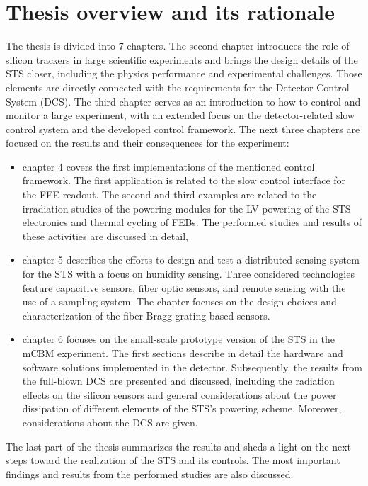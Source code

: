 \section{Thesis overview and its rationale}
The thesis is divided into 7 chapters. The second chapter introduces the role of silicon trackers in large scientific experiments and brings the design details of the \gls{STS} closer, including the physics performance and experimental challenges. Those elements are directly connected with the requirements for the Detector Control System (\gls{DCS}). The third chapter serves as an introduction to how to control and monitor a large experiment, with an extended focus on the detector-related slow control system and the developed control framework. The next three chapters are focused on the results and their consequences for the experiment:
\begin{itemize}
    \item chapter 4 covers the first implementations of the mentioned control framework. The first application is related to the slow control interface for the \gls{FEE} readout. The second and third examples are related to the irradiation studies of the powering modules for the \gls{LV} powering of the \gls{STS} electronics and thermal cycling of \glspl{FEB}. The performed studies and results of these activities are discussed in detail,
    \item chapter 5 describes the efforts to design and test a distributed sensing system for the \gls{STS} with a focus on humidity sensing. Three considered technologies feature capacitive sensors, fiber optic sensors, and remote sensing with the use of a sampling system. The chapter focuses on the design choices and characterization of the fiber Bragg grating-based sensors. 
    \item chapter 6 focuses on the small-scale prototype version of the \gls{STS} in the \gls{mCBM} experiment. The first sections describe in detail the hardware and software solutions implemented in the detector. Subsequently, the results from the full-blown \gls{DCS} are presented and discussed, including the radiation effects on the silicon sensors and general considerations about the power dissipation of different elements of the \gls{STS}'s powering scheme. Moreover, considerations about the \gls{DCS} are given. 
\end{itemize}
The last part of the thesis summarizes the results and sheds a light on the next steps toward the realization of the \gls{STS} and its controls. The most important findings and results from the performed studies are also discussed.